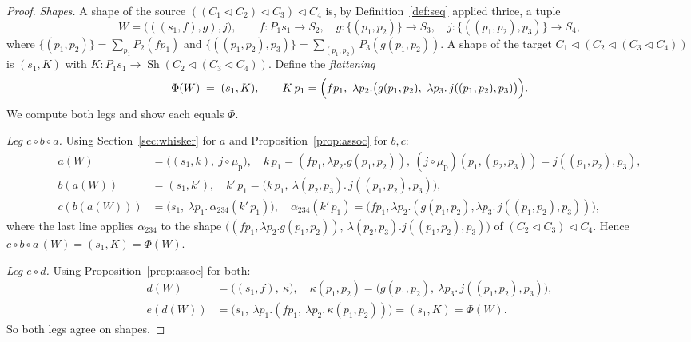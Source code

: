 \documentclass[11pt]{article}
\theoremstyle{definition}
\newcommand{\tri}{\mathbin{\triangleleft}}
\DeclareMathOperator{\Sh}{Sh}
\begin{document}
\begin{proof}
\emph{Shapes.} A shape of the source $((C_1\tri C_2)\tri C_3)\tri C_4$ is, by
Definition~\ref{def:seq} applied thrice, a tuple
\[
  W=\bigl(((s_1,f),g),j\bigr),\qquad
  f\colon P_1 s_1\to S_2,\quad
  g\colon\{(p_1,p_2)\}\to S_3,\quad
  j\colon\{((p_1,p_2),p_3)\}\to S_4,
\]
where $\{(p_1,p_2)\}=\sum_{p_1}P_2(f p_1)$ and
$\{((p_1,p_2),p_3)\}=\sum_{(p_1,p_2)}P_3(g(p_1,p_2))$. A shape of the target
$C_1\tri(C_2\tri(C_3\tri C_4))$ is $(s_1,K)$ with
$K\colon P_1 s_1\to\Sh(C_2\tri(C_3\tri C_4))$. Define the \emph{flattening}
\begin{equation}\label{eq:NF}
  \Phi(W)\;=\;(s_1,K),\qquad
  K\,p_1=\Bigl(f p_1,\ \lambda p_2.\bigl(g(p_1,p_2),\ \lambda p_3.\,
  j((p_1,p_2),p_3)\bigr)\Bigr).
\end{equation}
We compute both legs and show each equals $\Phi$.

\emph{Leg $c\circ b\circ a$.} Using Section~\ref{sec:whisker} for $a$ and
Proposition~\ref{prop:assoc} for $b,c$:
\begin{align*}
a(W)&=\bigl((s_1,k),\ j\circ\mu_{\mathrm p}\bigr),\quad
   k\,p_1=(f p_1,\lambda p_2.g(p_1,p_2)),\
   (j\circ\mu_{\mathrm p})(p_1,(p_2,p_3))=j((p_1,p_2),p_3),\\
b(a(W))&=(s_1,k'),\quad
   k'\,p_1=\bigl(k\,p_1,\ \lambda(p_2,p_3).\,j((p_1,p_2),p_3)\bigr),\\
c(b(a(W)))&=\bigl(s_1,\ \lambda p_1.\,\alpha_{234}(k'\,p_1)\bigr),\quad
   \alpha_{234}(k'\,p_1)=\bigl(f p_1,\lambda p_2.(g(p_1,p_2),\lambda p_3.\,
   j((p_1,p_2),p_3))\bigr),
\end{align*}
where the last line applies $\alpha_{234}$ to the shape
$\bigl((f p_1,\lambda p_2.g(p_1,p_2)),\ \lambda(p_2,p_3).j((p_1,p_2),p_3)\bigr)$
of $(C_2\tri C_3)\tri C_4$. Hence $c\circ b\circ a\,(W)=(s_1,K)=\Phi(W)$.

\emph{Leg $e\circ d$.} Using Proposition~\ref{prop:assoc} for both:
\begin{align*}
d(W)&=\bigl((s_1,f),\ \kappa\bigr),\quad
   \kappa(p_1,p_2)=\bigl(g(p_1,p_2),\ \lambda p_3.\,j((p_1,p_2),p_3)\bigr),\\
e(d(W))&=\bigl(s_1,\ \lambda p_1.(f p_1,\ \lambda p_2.\,\kappa(p_1,p_2))\bigr)
   =(s_1,K)=\Phi(W).
\end{align*}
So both legs agree on shapes.


\end{proof}
\end{document}

